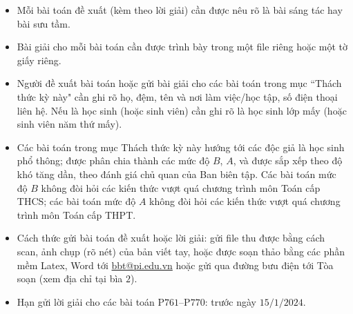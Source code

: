 \thispagestyle{thachthuctoanhocnone}
\pagestyle{thachthuctoanhoc}
\everymath{\color{thachthuctoanhoc}}
\graphicspath{{../thachthuctoanhoc/pic/}}
\begingroup
{}
\centering
\vspace*{4cm}
\endgroup
\vspace*{-8pt}
\begin{tBox}
	\begin{itemize}[leftmargin = 13pt, itemsep = 1.0pt] 
		\item Mỗi bài toán đề xuất (kèm theo lời giải) cần được nêu rõ là bài sáng tác hay bài sưu tầm.
		\item Bài giải cho mỗi bài toán cần được trình bày trong một file riêng hoặc
		một tờ giấy riêng.
		\item  Người đề xuất bài toán hoặc gửi bài giải cho các bài toán trong mục ``Thách thức kỳ này" cần ghi rõ họ, đệm, tên và nơi làm việc/học tập, số điện thoại liên hệ. Nếu là học sinh (hoặc sinh viên) cần ghi rõ là học sinh lớp mấy (hoặc sinh viên năm thứ mấy).
		\item Các bài toán trong mục Thách thức kỳ này hướng tới các độc giả là học sinh phổ thông; được phân chia thành các mức độ $B$, $A$, và được sắp xếp theo độ khó tăng dần, theo đánh giá chủ quan của Ban biên tập. Các bài toán mức độ $B$ không đòi hỏi các kiến thức vượt quá chương trình môn Toán cấp THCS; các bài toán mức độ $A$ không đòi hỏi các kiến thức vượt quá chương trình môn Toán cấp THPT.
		\item Cách thức gửi bài toán đề xuất hoặc lời giải: gửi file thu được bằng cách scan, ảnh chụp (rõ nét) của bản viết tay, hoặc được soạn thảo bằng các phần mềm Latex, Word tới \url{bbt@pi.edu.vn} hoặc gửi qua đường bưu điện tới Tòa soạn (xem địa chỉ tại bìa $2$).
		\item Hạn gửi lời giải cho các bài toán P$761$--P$770$: trước ngày $15/1/2024$.
	\end{itemize}
\end{tBox}
